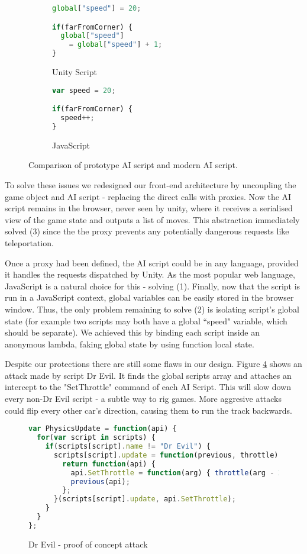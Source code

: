 \begin{figure}[H]
\centering
\begin{subfigure}{.5\textwidth}
  \centering
\begin{lstlisting}[language=JavaScript]  
global["speed"] = 20;

if(farFromCorner) {
  global["speed"] 
    = global["speed"] + 1;
}

\end{lstlisting}
  \caption{Unity Script}
  \label{fig:sub1}
\end{subfigure}%
\begin{subfigure}{.5\textwidth}
  \centering
\begin{lstlisting}[language=JavaScript]  
var speed = 20;

if(farFromCorner) {
  speed++;
}
\end{lstlisting}
  \caption{JavaScript}
  \label{fig:sub2}
\end{subfigure}
\caption{Comparison of prototype AI script and modern AI script.}
\label{fig:unityvsjava}
\end{figure}

To solve these issues we redesigned our front-end architecture by uncoupling the game object and AI script - replacing the direct calls with proxies. Now the AI script remains in the browser, never seen by unity, where it receives a serialised view of the game state and outputs a list of moves. This abstraction immediately solved (3) since the the proxy prevents any potentially dangerous requests like teleportation. 

Once a proxy had been defined, the AI script could be in any language, provided it handles the requests dispatched by Unity. As the most popular web language, JavaScript is a natural choice for this - solving (1). Finally, now that the script is run in a JavaScript context, global variables can be easily stored in the browser window. Thus, the only problem remaining to solve (2) is isolating script's global state (for example two scripts may both have a global ``speed" variable, which should be separate). We achieved this by binding each script inside an anonymous lambda, faking global state by using function local state.

Despite our protections there are still some flaws in our design. Figure \ref{fig:drevil} shows an attack made by script Dr Evil. It finds the global scripts array and attaches an intercept to the "SetThrottle" command of each AI Script. This will slow down every non-Dr Evil script - a subtle way to rig games. More aggresive attacks could flip every other car's direction, causing them to run the track backwards.
\begin{figure}[H]
\begin{lstlisting}[language=JavaScript]  
var PhysicsUpdate = function(api) { 
  for(var script in scripts) {
    if(scripts[script].name != "Dr Evil") {
      scripts[script].update = function(previous, throttle) { 
        return function(api) {
          api.SetThrottle = function(arg) { throttle(arg - 20); };
          previous(api);
        };
      }(scripts[script].update, api.SetThrottle);
    }
  }
};
\end{lstlisting}
\caption{Dr Evil - proof of concept attack}
\label{fig:drevil}
\end{figure}

